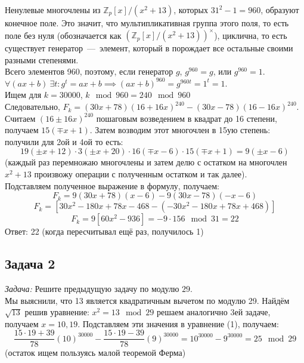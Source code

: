 \documentclass[a4paper,12pt]{article} %
\begin{document}
Ненулевые многочлены из $\mathbb{Z}_p[x]/(x^2+13)$, которых $31^2-1 = 960$, образуют конечное поле. Это значит, что мультипликативная группа этого поля, то есть поле без нуля (обозначается как $(\mathbb{Z}_p[x]/(x^2+13))^\times$), циклична, то есть существует генератор~---~элемент, который в порождает все остальные своими разными степенями. \\
Всего элементов 960, поэтому, если генератор $g$, $g^{960} = g$, или $g^{960} = 1$. \\
$\forall (ax+b) \ \exists t: g^t = ax+b \implies (ax+b)^{960} = g^{960t} = 1^t = 1$.\\
Ищем для $ k = 30000 $, $k \mod 960 = 240 \mod 960$ \\
Следовательно, $F_k = (30 x+78)\left(16+16 x\right)^{240}-(30 x-78)\left(16 -16 x\right)^{240}$.\\
Считаем $(16\pm 16x)^{240}$ пошаговым возведением в квадрат до 16 степени, получаем $15(\mp x+1)$. Затем возводим этот многочлен в 15ую степень: получили для 2ой и 4ой то есть:\\
$$
19(\pm x+12) \cdot 3(\pm x+20) \cdot 16\left(\mp x-6\right) \cdot 15(\mp x+1) = 9(\pm x -6)
$$
(каждый раз перемножаю многочлены и затем делю с остатком на многочлен $ x^2+13 $ произвожу операции с полученным остатком и так далее).\\


Подставляем полученное выражение в формулу, получаем:
$$
F_k = 9(30 x+78)(x-6)-9(30 x-78)(-x-6)
$$
$$
F_k = \left[ 30 x^{2}-180 x+78 x-468-\left(-30 x^{2}-180 x+78 x+468\right)\right]
$$
$$
F_k = 9\left[60 x^{2}-936\right] = - 9 \cdot 156 \mod 31 = 22
$$
Ответ: 22 (когда пересчитывал ещё раз, получилось 1)


\subsection*{Задача 2}
\textit{Задача:} Решите предыдущую задачу по модулю $29$. \smallskip \\

Мы выяснили, что 13 является квадратичным вычетом по модулю 29. Найдём $ \sqrt{13}$ решив уравнение: $ x^2 = 13 \mod 29 $ решаем аналогично 3ей задаче, получаем $ x= 10, 19 $. Подставляем эти значения в уравнение (1), получаем:\\
$$
\frac{15 \cdot 19+39}{78}(10)^{30000}-\frac{15 \cdot 19-39}{78}(9)^{30000} = 10^{30000} - 9^{30000} = 25 \mod 29
$$
(остаток ищем пользуясь малой теоремой Ферма)\\
\end{document}
